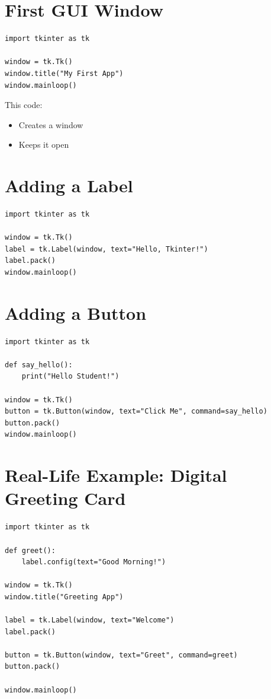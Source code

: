 \section{First GUI Window}

\begin{verbatim}
import tkinter as tk

window = tk.Tk()
window.title("My First App")
window.mainloop()
\end{verbatim}

This code:
\begin{itemize}
    \item Creates a window
    \item Keeps it open
\end{itemize}

\section{Adding a Label}

\begin{verbatim}
import tkinter as tk

window = tk.Tk()
label = tk.Label(window, text="Hello, Tkinter!")
label.pack()
window.mainloop()
\end{verbatim}

\section{Adding a Button}

\begin{verbatim}
import tkinter as tk

def say_hello():
    print("Hello Student!")

window = tk.Tk()
button = tk.Button(window, text="Click Me", command=say_hello)
button.pack()
window.mainloop()
\end{verbatim}

\section{Real-Life Example: Digital Greeting Card}

\begin{verbatim}
import tkinter as tk

def greet():
    label.config(text="Good Morning!")

window = tk.Tk()
window.title("Greeting App")

label = tk.Label(window, text="Welcome")
label.pack()

button = tk.Button(window, text="Greet", command=greet)
button.pack()

window.mainloop()
\end{verbatim}

